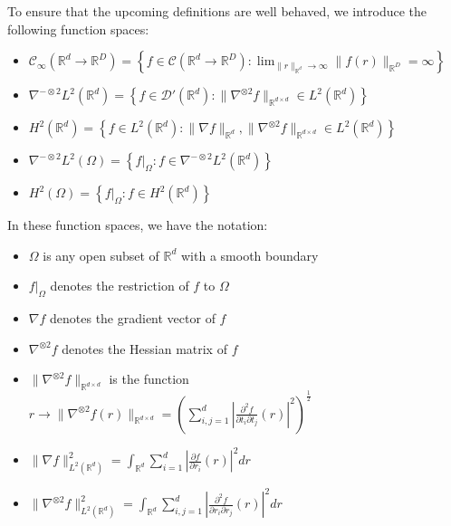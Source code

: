 \documentclass[11pt,reqno]{article}
\theoremstyle{definition}
\begin{document}
To ensure that the upcoming definitions are well behaved, we introduce the following function spaces:
\begin{itemize}
  \item $\mathcal{C}_{\infty}(\mathbb{R}^{d} \to \mathbb{R}^{D}) = \left\{f \in \mathcal{C}(\mathbb{R}^{d} \to \mathbb{R}^{D}): \lim_{\|r\|_{\mathbb{R}^{d}} \to \infty}\|f(r)\|_{\mathbb{R}^{D}} = \infty\right\}$
  \item $\nabla^{-\otimes 2}L^2(\mathbb{R}^{d}) = \left\{f \in \mathcal{D}'(\mathbb{R}^{d}): \|\nabla^{\otimes 2}f\|_{\mathbb{R}^{d \times d}} \in L^2(\mathbb{R}^{d})\right\}$
  \item $H^2(\mathbb{R}^{d}) = \left\{f \in L^2(\mathbb{R}^{d}): \|\nabla f\|_{\mathbb{R}^{d}}, \|\nabla^{\otimes 2}f\|_{\mathbb{R}^{d \times d}} \in L^2(\mathbb{R}^{d})\right\}$
  \item $\nabla^{-\otimes 2}L^2(\Omega) = \left\{f|_{\Omega}: f \in \nabla^{-\otimes 2}L^2(\mathbb{R}^{d})\right\}$
  \item $H^2(\Omega) = \left\{f|_{\Omega}: f \in H^2(\mathbb{R}^{d})\right\}$
\end{itemize}

In these function spaces, we have the notation:
\begin{itemize}
  \item $\Omega$ is any open subset of $\mathbb{R}^{d}$ with a smooth boundary
  \item $f|_{\Omega}$ denotes the restriction of $f$ to $\Omega$
  \item $\nabla f$ denotes the gradient vector of $f$
  \item $\nabla^{\otimes 2}f$ denotes the Hessian matrix of $f$
  \item $\|\nabla^{\otimes 2}f\|_{\mathbb{R}^{d \times d}}$ is the function $r \to \|\nabla^{\otimes 2}f(r)\|_{\mathbb{R}^{d \times d}} = \left(\sum_{i, j = 1}^{d}\left|\frac{\partial^2f}{\partial t_i \partial t_j}(r)\right|^2\right)^{\frac{1}{2}}$
  \item $\|\nabla f\|_{L^2(\mathbb{R}^{d})}^2 = \int_{\mathbb{R}^{d}}\sum_{i=1}^{d}\left|\frac{\partial f}{\partial r_i}(r)\right|^2dr $
  \item $\|\nabla^{\otimes 2}f\|_{L^2(\mathbb{R}^{d})}^2 = \int_{\mathbb{R}^{d}}\sum_{i, j = 1}^{d}\left|\frac{\partial^2f}{\partial r_i \partial r_j}(r)\right|^2dr $
\end{itemize}
\end{document}

